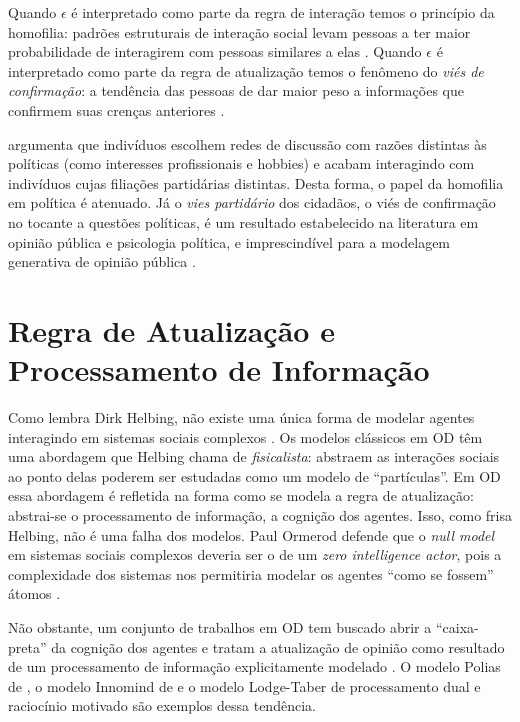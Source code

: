 Quando \(\epsilon\) é interpretado como parte da regra de interação temos o princípio
da homofilia: padrões estruturais de interação social levam pessoas a ter maior
probabilidade de interagirem com pessoas similares a elas
\cite{mcpherson2001birds}. Quando \(\epsilon\) é interpretado como parte da regra de
atualização temos o fenômeno do \textit{viés de confirmação}: a tendência das
pessoas de dar maior peso a informações que confirmem suas crenças anteriores
\cite{nickerson1998confirmation}.

 argumenta que indivíduos escolhem redes de
discussão com razões distintas às políticas (como interesses profissionais e
hobbies) e acabam interagindo com indivíduos cujas filiações partidárias
distintas. Desta forma, o papel da homofilia em política é atenuado. Já o
\textit{vies partidário} dos cidadãos, o viés de confirmação no tocante a
questões políticas, é um resultado estabelecido na literatura em opinião
pública e psicologia política, e imprescindível para a modelagem generativa de
opinião pública \cite{bartels2002beyond, flynn2017nature,
  lodge2013rationalizing}.


\section{Regra de Atualização e Processamento de Informação}


Como lembra Dirk Helbing, não existe uma única forma de modelar agentes
interagindo em sistemas sociais complexos \cite{helbing2010pluralistic}. Os
modelos clássicos em OD têm uma abordagem que Helbing chama de
\textit{fisicalista}: abstraem as interações sociais ao ponto delas poderem ser
estudadas como um modelo de ``partículas''. Em OD essa abordagem é refletida na
forma como se modela a regra de atualização: abstrai-se o processamento de
informação, a cognição dos agentes. Isso, como frisa Helbing, não é uma falha
dos modelos. Paul Ormerod defende que o \textit{null model} em sistemas sociais
complexos deveria ser o de um \textit{zero intelligence actor}, pois a
complexidade dos sistemas nos permitiria modelar os agentes ``como se fossem''
átomos \cite{ormerod2008can, bentley2012agents}.

Não obstante, um conjunto de trabalhos em OD tem buscado abrir a ``caixa-preta''
da cognição dos agentes e tratam a atualização de opinião como resultado de um
processamento de informação explicitamente modelado \cite{flache2017,
  jager2017}. O modelo Polias de , o modelo
Innomind de  e o modelo Lodge-Taber
\cite{kim2010computational,kim2011model} de processamento dual e raciocínio
motivado são exemplos dessa tendência.

